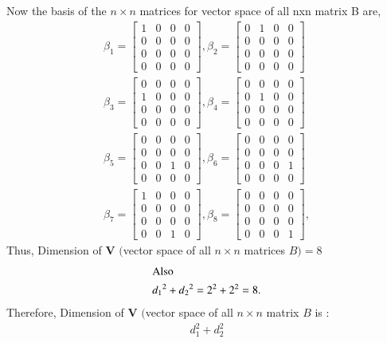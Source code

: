 \documentclass[journal,12pt,twocolumn]{IEEEtran}
\begin{document}
Now the basis of the $n \times n $  matrices for vector space of all nxn matrix B are,
\begin{align}
\beta_1 =  \begin{bmatrix}
1 & 0  & 0 & 0 \\ 
0 & 0  & 0 & 0  \\
0 & 0  & 0 & 0  \\
0 & 0  & 0 & 0    
\end{bmatrix},
 \beta_2 =  \begin{bmatrix}
0 & 1  & 0 & 0 \\ 
0 & 0  & 0 & 0  \\
0 & 0  & 0 & 0  \\
0 & 0  & 0 & 0    
\end{bmatrix}\\
\beta_3 =  \begin{bmatrix}
0 & 0  & 0 & 0 \\ 
1 & 0  & 0 & 0  \\
0 & 0  & 0 & 0  \\
0 & 0  & 0 & 0    
\end{bmatrix},
\beta_4 =  \begin{bmatrix}
0 & 0  & 0 & 0 \\ 
0 & 1  & 0 & 0  \\
0 & 0  & 0 & 0  \\
0 & 0  & 0 & 0    
\end{bmatrix}\\
\beta_5 =  \begin{bmatrix}
0 & 0  & 0 & 0 \\ 
0 & 0  & 0 & 0  \\
0 & 0  & 1 & 0  \\
0 & 0  & 0 & 0    
\end{bmatrix},
\beta_6 =  \begin{bmatrix}
0 & 0  & 0 & 0 \\ 
0 & 0  & 0 & 0  \\
0 & 0  & 0 & 1  \\
0 & 0  & 0 & 0    
\end{bmatrix}\\
\beta_7 =  \begin{bmatrix}
1 & 0  & 0 & 0 \\ 
0 & 0  & 0 & 0  \\
0 & 0  & 0 & 0  \\
0 & 0  & 1 & 0    
\end{bmatrix},
\beta_8 =  \begin{bmatrix}
0 & 0  & 0 & 0 \\ 
0 & 0  & 0 & 0  \\
0 & 0  & 0 & 0  \\
0 & 0  & 0 & 1    
\end{bmatrix},
\end{align}
Thus, Dimension of $\mathbf{V}$ $($vector space of all $n \times n$ matrices $ B ) = 8$
\begin{align}
\intertext{Also}
 {d_1}^{2} + d{_2}^2 = 2^{2}+2^{2} = 8. 
 \end{align}
Therefore, Dimension of $\mathbf{V}$ $($vector space of all $ n \times n$ matrix $B$ is :
\begin{align}
 d_1^2+d_2^2
 \end{align}
\end{document}
